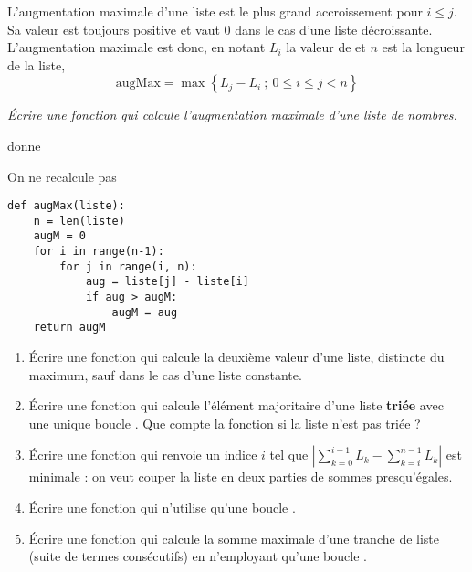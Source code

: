 \medskip

L'augmentation maximale d'une liste est le plus grand accroissement  pour $i \le j$. Sa valeur est toujours positive et vaut 0 dans le cas d'une liste décroissante. L'augmentation maximale est donc, en notant $L_i$ la valeur de  et $n$ est la longueur de la liste,
\[\text{augMax} = \max\left\{L_j - L_i\ ;\ 0\le i \le j < n\right\}\]
\begin{Exercise}[title=Augmentation maximale]
\it  Écrire une fonction  qui calcule l'augmentation maximale d'une liste de nombres. 

 donne 
\end{Exercise}
\begin{Answer} On ne recalcule pas 
\begin{lstlisting}
def augMax(liste):
    n = len(liste)
    augM = 0
    for i in range(n-1):
        for j in range(i, n):
            aug = liste[j] - liste[i]
            if aug > augM:
                augM = aug
    return augM
\end{lstlisting}
\newpage
\end{Answer}
\begin{Exercise}[title={En plus}, difficulty = 2]
\it  
\begin{enumerate}
    \item Écrire une fonction  qui calcule la deuxième valeur d'une liste, distincte du maximum, sauf dans le cas d'une liste constante.
    \item Écrire une fonction  qui calcule l'élément majoritaire d'une liste {\bf triée} avec une unique boucle . Que compte la fonction si la liste n'est pas triée ?
    \item Écrire une fonction  qui renvoie un indice $i$ tel que $\displaystyle \left|\sum_{k=0}^{i-1}L_k-\sum_{k=i}^{n-1}L_k\right|$ est minimale : on veut couper la liste en deux parties de sommes presqu'égales.
    \item Écrire une fonction  qui n'utilise qu'une boucle .
    \item Écrire une fonction qui calcule la somme maximale d'une tranche de liste (suite de termes consécutifs) en n'employant qu'une boucle .
\end{enumerate}
\end{Exercise}
